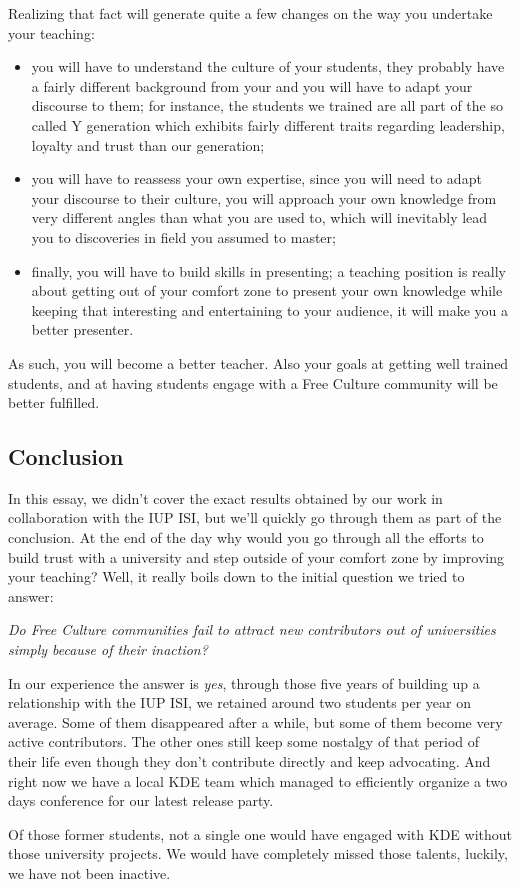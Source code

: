 Realizing that fact will generate quite a few changes on the way you undertake your teaching:
\begin{itemize}
  \item you will have to understand the culture of your students, they probably         have a fairly different background from your and you will have to adapt your discourse to them; for instance, the students we trained are all part of the so called Y generation which exhibits fairly different traits regarding leadership, loyalty and trust than our generation;
  \item you will have to reassess your own expertise, since you will need to adapt your discourse to their culture, you will approach your own knowledge from very different angles than what you are used to, which will inevitably lead you to discoveries in field you assumed to master;
  \item finally, you will have to build skills in presenting; a teaching position is really about getting out of your comfort zone to present your own knowledge while keeping that interesting and entertaining to your audience, it will make you a better presenter.
\end{itemize}

As such, you will become a better teacher. Also your goals at getting well trained students, and at having students engage with a Free Culture community will be better fulfilled.

\subsection*{Conclusion}
In this essay, we didn't cover the exact results obtained by our work in collaboration with the IUP ISI, but we'll quickly go through them as part of the conclusion. At the end of the day why would you go through all the efforts to build trust with a university and step outside of your comfort zone by improving your teaching? Well, it really boils down to the initial question we tried to answer:

\emph{Do Free Culture communities fail to attract new contributors out of universities simply because of their inaction?}

In our experience the answer is \emph{yes}, through those five years of building up a relationship with the IUP ISI, we retained around two students per year on average. Some of them disappeared after a while, but some of them become very active contributors. The other ones still keep some nostalgy of that period of their life even though they don't contribute directly and keep advocating. And right now we have a local KDE team which managed to efficiently organize a two days conference for our latest release party.

Of those former students, not a single one would have engaged with KDE without those university projects. We would have completely missed those talents, luckily, we have not been inactive.
